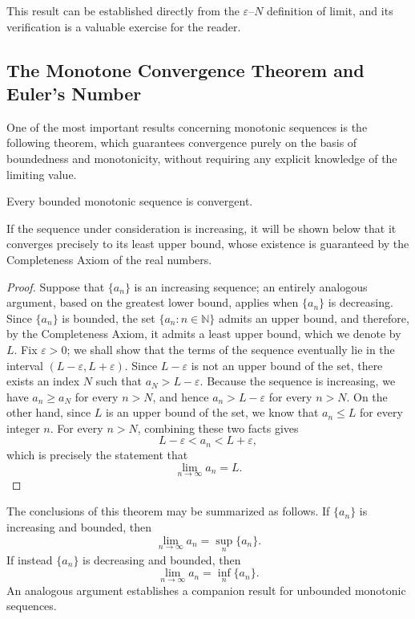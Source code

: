 This result can be established directly from the $\varepsilon$--$N$ definition of limit, and its verification is
a valuable exercise for the reader.



\subsection{The Monotone Convergence Theorem and Euler's Number}

One of the most important results concerning monotonic sequences is the following theorem, which guarantees
convergence purely on the basis of boundedness and monotonicity, without requiring any explicit knowledge of the
limiting value.

\begin{theorem}
Every bounded monotonic sequence is convergent.
\end{theorem}

\begin{remark}
If the sequence under consideration is increasing, it will be shown below that it converges precisely to its
least upper bound, whose existence is guaranteed by the Completeness Axiom of the real numbers.
\end{remark}

\begin{proof}
Suppose that $\{a_n\}$ is an increasing sequence; an entirely analogous argument, based on the greatest lower
bound, applies when $\{a_n\}$ is decreasing. Since $\{a_n\}$ is bounded, the set $\{a_n : n \in \mathbb{N}\}$
admits an upper bound, and therefore, by the Completeness Axiom, it admits a least upper bound, which we denote
by $L$. Fix $\varepsilon > 0$; we shall show that the terms of the sequence eventually lie in the interval
$(L - \varepsilon, L + \varepsilon)$. Since $L - \varepsilon$ is not an upper bound of the set, there exists an
index $N$ such that $a_N > L - \varepsilon$. Because the sequence is increasing, we have $a_n \geq a_N$ for every
$n > N$, and hence $a_n > L - \varepsilon$ for every $n > N$. On the other hand, since $L$ is an upper bound of
the set, we know that $a_n \leq L$ for every integer $n$. For every $n > N$, combining these two facts gives
\[
L - \varepsilon < a_n < L + \varepsilon,
\]
which is precisely the statement that
\[
\lim_{n \to \infty} a_n = L.
\]

\end{proof}

The conclusions of this theorem may be summarized as follows. If $\{a_n\}$ is increasing and bounded, then
\[
\lim_{n \to \infty} a_n = \sup_n \{a_n\}.
\]
If instead $\{a_n\}$ is decreasing and bounded, then
\[
\lim_{n \to \infty} a_n = \inf_n \{a_n\}.
\]
An analogous argument establishes a companion result for unbounded monotonic sequences.

